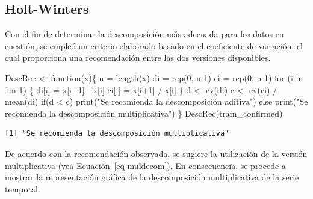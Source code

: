 \documentclass[
  us-letterpaper,
]{scrreprt}
\newenvironment{Shaded}{\begin{snugshade}}{\end{snugshade}}
\newcommand{\ControlFlowTok}[1]{\textcolor[rgb]{0.00,0.23,0.31}{#1}}
\newcommand{\DecValTok}[1]{\textcolor[rgb]{0.68,0.00,0.00}{#1}}
\newcommand{\FunctionTok}[1]{\textcolor[rgb]{0.28,0.35,0.67}{#1}}
\newcommand{\NormalTok}[1]{\textcolor[rgb]{0.00,0.23,0.31}{#1}}
\newcommand{\OtherTok}[1]{\textcolor[rgb]{0.00,0.23,0.31}{#1}}
\newcommand{\SpecialCharTok}[1]{\textcolor[rgb]{0.37,0.37,0.37}{#1}}
\newcommand{\StringTok}[1]{\textcolor[rgb]{0.13,0.47,0.30}{#1}}
\theoremstyle{plain}
\theoremstyle{definition}
\theoremstyle{plain}
\theoremstyle{definition}
\theoremstyle{remark}
\begin{document}
\subsection{Holt-Winters}\label{sec-holt-winters}

Con el fin de determinar la descomposición más adecuada para los datos
en cuestión, se empleó un criterio elaborado basado en el coeficiente de
variación, el cual proporciona una recomendación entre las dos versiones
disponibles.

\begin{Shaded}
\begin{Highlighting}[]
\NormalTok{DescRec }\OtherTok{\textless{}{-}} \ControlFlowTok{function}\NormalTok{(x)\{}
\NormalTok{  n }\OtherTok{=} \FunctionTok{length}\NormalTok{(x)}
\NormalTok{  di }\OtherTok{=} \FunctionTok{rep}\NormalTok{(}\DecValTok{0}\NormalTok{, n}\DecValTok{{-}1}\NormalTok{)}
\NormalTok{  ci }\OtherTok{=} \FunctionTok{rep}\NormalTok{(}\DecValTok{0}\NormalTok{, n}\DecValTok{{-}1}\NormalTok{)}
  \ControlFlowTok{for}\NormalTok{ (i }\ControlFlowTok{in} \DecValTok{1}\SpecialCharTok{:}\NormalTok{n}\DecValTok{{-}1}\NormalTok{) \{}
\NormalTok{    di[i] }\OtherTok{=}\NormalTok{ x[i}\SpecialCharTok{+}\DecValTok{1}\NormalTok{] }\SpecialCharTok{{-}}\NormalTok{ x[i]}
\NormalTok{    ci[i] }\OtherTok{=}\NormalTok{ x[i}\SpecialCharTok{+}\DecValTok{1}\NormalTok{] }\SpecialCharTok{/}\NormalTok{ x[i]}
\NormalTok{  \}}
\NormalTok{  d }\OtherTok{\textless{}{-}} \FunctionTok{cv}\NormalTok{(di) }
\NormalTok{  c }\OtherTok{\textless{}{-}} \FunctionTok{cv}\NormalTok{(ci) }\SpecialCharTok{/} \FunctionTok{mean}\NormalTok{(di)}
  \ControlFlowTok{if}\NormalTok{(d }\SpecialCharTok{\textless{}}\NormalTok{ c)}
    \FunctionTok{print}\NormalTok{(}\StringTok{"Se recomienda la descomposición aditiva"}\NormalTok{)}
  \ControlFlowTok{else}
    \FunctionTok{print}\NormalTok{(}\StringTok{"Se recomienda la descomposición multiplicativa"}\NormalTok{)}
\NormalTok{\}}
\FunctionTok{DescRec}\NormalTok{(train\_confirmed)}
\end{Highlighting}
\end{Shaded}

\begin{verbatim}
[1] "Se recomienda la descomposición multiplicativa"
\end{verbatim}

De acuerdo con la recomendación observada, se sugiere la utilización de
la versión multiplicativa (vea Ecuación~\ref{eq-muldecom}). En
consecuencia, se procede a mostrar la representación gráfica de la
descomposición multiplicativa de la serie temporal.
\end{document}
